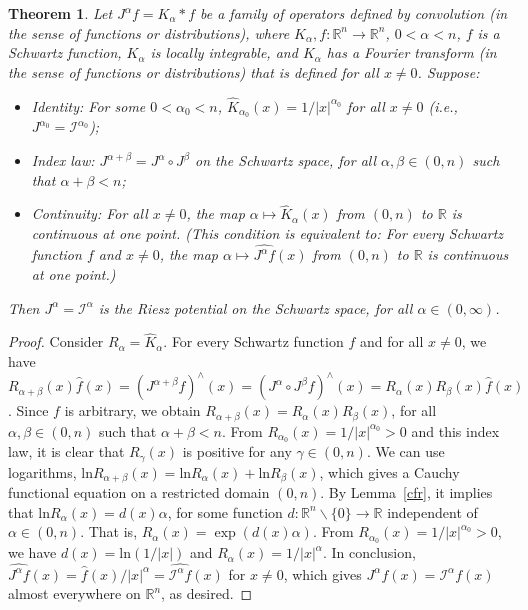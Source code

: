 \documentclass[12pt,reqno]{amsart}
\theoremstyle{plain}
\newtheorem{theorem}{Theorem}[section] %
\numberwithin{equation}{section} %
\begin{document}
\begin{theorem} \label{th1RR}
Let $J^\alpha f=K_\alpha\ast f$ be a family of operators defined by convolution (in the sense of functions or distributions), where $K_\alpha,f:\mathbb{R}^n\rightarrow\mathbb{R}^n$, $0<\alpha<n$, $f$ is a Schwartz function, $K_\alpha$ is locally integrable, and $K_\alpha$ has a Fourier transform (in the sense of functions or distributions) that is defined for all $x\neq 0$. Suppose: 
\begin{itemize}
\item Identity: For some $0<\alpha_0<n$, $\widehat{K}_{\alpha_0}(x)=1/|x|^{\alpha_0}$ for all $x\neq 0$ (i.e., $J^{\alpha_0}=\mathcal{I}^{\alpha_0}$);
\item Index law: $J^{\alpha+\beta}=J^\alpha\circ J^\beta$ on the Schwartz space, for all $\alpha,\beta\in (0,n)$ such that $\alpha+\beta<n$; 
\item Continuity: For all $x\neq 0$, the map $\alpha\mapsto \widehat{K}_\alpha(x)$ from $(0,n)$ to $\mathbb{R}$ is continuous at one point. (This condition is equivalent to: For every Schwartz function $f$ and $x\neq 0$, the map $\alpha\mapsto \widehat{J^{\alpha}f}(x)$ from $(0,n)$ to $\mathbb{R}$ is continuous at one point.)
\end{itemize}
Then $J^\alpha=\mathcal{I}^\alpha$ is the Riesz potential on the Schwartz space, for all $\alpha\in (0,\infty)$.
\end{theorem}
\begin{proof}
Consider $R_\alpha=\widehat{K}_\alpha$. For every Schwartz function $f$ and for all $x\neq 0$, we have $R_{\alpha+\beta}(x)\widehat{f}(x)=(J^{\alpha+\beta}f)^\wedge(x)=(J^\alpha\circ J^\beta f)^\wedge(x)=R_\alpha(x)R_\beta(x)\widehat{f}(x)$. Since $f$ is arbitrary, we obtain $R_{\alpha+\beta}(x)=R_\alpha(x)R_\beta(x)$, for all $\alpha,\beta\in (0,n)$ such that $\alpha+\beta<n$. From $R_{\alpha_0}(x)=1/|x|^{\alpha_0}>0$ and this index law, it is clear that $R_\gamma(x)$ is positive for any $\gamma\in (0,n)$. We can use logarithms, $\mathrm{ln}R_{\alpha+\beta}(x)=\mathrm{ln}R_\alpha(x)+\mathrm{ln}R_\beta(x)$, which gives a Cauchy functional equation on a restricted domain $(0,n)$. By Lemma~\ref{cfr}, it implies that $\mathrm{ln}R_\alpha(x)=d(x)\alpha$, for some function $d:\mathbb{R}^n\backslash\{0\}\rightarrow\mathbb{R}$ independent of $\alpha\in (0,n)$. That is, $R_\alpha(x)=\exp(d(x)\alpha)$. From $R_{\alpha_0}(x)=1/|x|^{\alpha_0}>0$, we have $d(x)=\mathrm{ln}(1/|x|)$ and $R_\alpha(x)=1/|x|^\alpha$. In conclusion, $\widehat{J^\alpha f}(x)=\widehat{f}(x)/|x|^\alpha=\widehat{\mathcal{I}^\alpha f}(x)$ for $x\neq 0$, which gives $J^\alpha f(x)=\mathcal{I}^\alpha f(x)$ almost everywhere on $\mathbb{R}^n$, as desired.
\end{proof}
\end{document}
